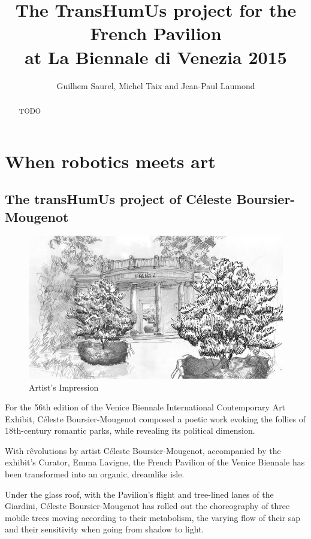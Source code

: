 \documentclass[letterpaper, 10 pt, conference]{IEEEtran}
\title{\LARGE \bf The TransHumUs project for the French Pavilion \\ at La Biennale di Venezia 2015}
\author{Guilhem Saurel, Michel Taix and Jean-Paul Laumond}
\begin{document}
\maketitle
\thispagestyle{empty}
\pagestyle{empty}

\begin{abstract}
    TODO
\end{abstract}

\section{When robotics meets art}
\subsection{The transHumUs project of Céleste Boursier-Mougenot}

\begin{figure}[thpb]
    \centering
    \includegraphics[width=\linewidth]{img/vue_artiste.jpg}
    \caption{Artist's Impression}
    \label{artists_impression}
\end{figure}

For the 56th edition of the Venice Biennale International Contemporary Art Exhibit, Céleste Boursier-Mougenot composed a poetic work evoking the follies of 18th-century romantic parks, while revealing its political dimension.

With rêvolutions by artist Céleste Boursier-Mougenot, accompanied by the exhibit’s Curator, Emma Lavigne, the French Pavilion of the Venice Biennale has been transformed into an organic, dreamlike isle.

Under the glass roof, with the Pavilion’s flight and tree-lined lanes of the Giardini, Céleste Boursier-Mougenot has rolled out the choreography of three mobile trees moving according to their metabolism, the varying flow of their sap and their sensitivity when going from shadow to light.
\end{document}
